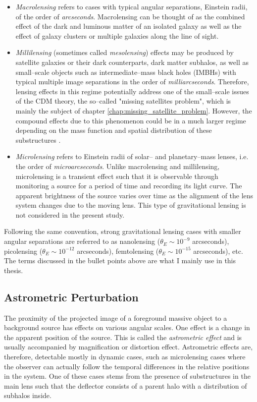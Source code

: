 \documentclass[a4wide,12pt]{book}
\begin{document}
{\begin{itemize} 
\item \emph{Macrolensing} refers to cases with typical angular separations, Einstein radii, of the order of \emph{arcseconds}. Macrolensing can be thought of as the combined effect of the dark and luminous matter of an isolated galaxy as well as the effect of galaxy clusters or multiple galaxies along the line of sight. 
\item \emph{Millilensing} (sometimes called \emph{mesolensing}) effects may be produced by satellite galaxies or their dark counterparts, dark matter subhalos, as well as small--scale objects such as intermediate--mass black holes (IMBHs) with typical multiple image separations in the order of \emph{milliarcseconds}. Therefore, lensing effects in this regime potentially address one of the small--scale issues of the CDM theory, the so--called "missing satellites problem", which is mainly the subject of chapter \ref{chap:missing_satellite_problem}. However, the compound effects due to this phenomenon could be in a much larger regime depending on the mass function and spatial distribution of these substructures \citet{Treu10}.
\item \emph{Microlensing} refers to Einstein radii of solar-- and planetary--mass lenses, i.e. the order of \emph{microarcseconds}. Unlike macrolensing and millilensing, microlensing is a transient effect such that it is observable through monitoring a source for a period of time and recording its light curve. The apparent brightness of the source varies over time as the alignment of the lens system changes due to the moving lens. This type of gravitational lensing is not considered in the present study.
\end{itemize}

Following the same convention, strong gravitational lensing cases with smaller angular separations are referred to as nanolensing ($\theta_E \sim 10^{-9}$ arcseconds), picolensing ($\theta_E \sim 10^{-12}$ arcseconds), femtolensing ($\theta_E \sim 10^{-15}$ arcseconds), etc. The terms discussed in the bullet points above are what I mainly use in this thesis.

\subsection{Astrometric Perturbation}
The proximity of the projected image of a foreground massive object to a background source has effects on various angular scales. One effect is a change in the apparent position of the source. This is called the \emph{astrometric effect} and is usually accompanied by magnification or distortion effect. Astrometric effects are, therefore, detectable mostly in dynamic cases, such as microlensing cases where the observer can actually follow the temporal differences in the relative positions in the system. One of these cases stems from the presence of substructures in the main lens such that the deflector consists of a parent halo with a distribution of subhalos inside. 
 
}
\end{document}
